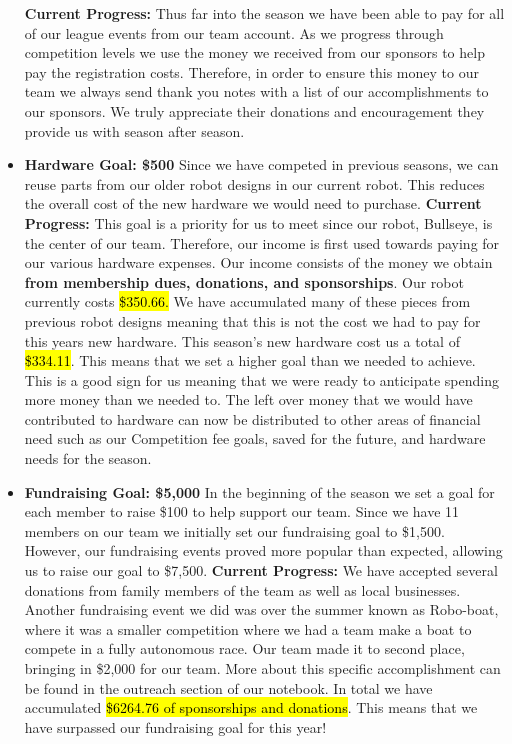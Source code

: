 \begin{itemize}
  \textbf{Current Progress: }
 	Thus far into the season we have been able to pay for all of our league events from our team account. As we progress through competition levels we use the money we received from our sponsors to help pay the registration costs. Therefore, in order to ensure this money to our team we always send thank you notes with a list of our accomplishments to our sponsors. We truly appreciate their donations and encouragement they provide us with season after season. 
  \item \textbf{\Large Hardware Goal: \$500 }
  \newline 
  Since we have competed in previous seasons, we can reuse parts from our older robot designs in our current robot. This reduces the overall cost of the new hardware we would need to purchase. 
  \newline
  \textbf{Current Progress: }
  This goal is a priority for us to meet since our robot, Bullseye, is the center of our team. Therefore, our income is first used towards paying for our various hardware expenses. Our income consists of the money we obtain \textbf{from membership dues, donations, and sponsorships}. Our robot currently costs \hl{\$350.66.} We have accumulated many of these pieces from previous robot designs meaning that this is not the cost we had to pay for this years new hardware. This season's new hardware cost us a total of \hl{\$334.11}. This means that we set a higher goal than we needed to achieve. This is a good sign for us meaning that we were ready to anticipate spending more money than we needed to. The left over money that we would have contributed to hardware can now be distributed to other areas of financial need such as our Competition fee goals, saved for the future, and hardware needs for the season.
  \item \textbf{\Large Fundraising Goal: \$5,000 }
  \newline 
In the beginning of the season we set a goal for each member to raise \$100 to help support our team. Since we have 11 members on our team we initially set our fundraising goal to \$1,500. However, our fundraising events proved more popular than expected, allowing us to raise our goal to \$7,500.
  \newline 
  \textbf{Current Progress: }We have accepted several donations from family members of the team as well as local businesses. Another fundraising event we did was over the summer known as Robo-boat, where it was a smaller competition where we had a team make a boat to compete in a fully autonomous race. Our team made it to second place, bringing in \$2,000 for our team. More about this specific accomplishment can be found in the outreach section of our notebook. In total we have accumulated \hl{\$6264.76 of sponsorships and donations}. This means that we have surpassed our fundraising goal for this year!
  
\end{itemize}

